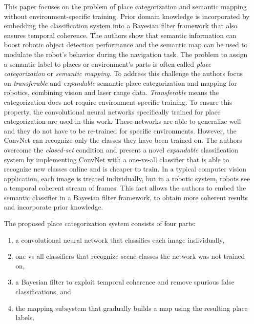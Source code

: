 This paper focuses on the problem of place categorization and semantic mapping without environment-specific training.  Prior domain knowledge is incorporated by embedding the classification system into a Bayesian
filter framework that also ensures temporal coherence. The authors show that semantic information can boost robotic object detection performance and the semantic map can be used to modulate the robot's behavior during the navigation task.
The problem to assign a semantic label to places or environment's parts is often called \textit{place categorization} or \textit{semantic mapping}. To address this challenge the authors  focus on \textit{transferable} and \textit{expandable} semantic place categorization and mapping for robotics, combining vision and laser range data. \textit{Transferable} means the categorization does not require environment-specific training. To ensure this property, the convolutional neural networks specifically trained for place categorization are used in this work. These networks are able to generalize well and they do not have to be re-trained for specific environments. However, the ConvNet can recognize only the classes they have been trained on. The authors overcome the \textit{closed-set} condition and present a novel \textit{expandable} classification system by implementing ConvNet with a one-vs-all classifier that is able to recognize new classes online and is cheaper to train. In a typical computer vision application, each image is treated individually, but in a robotic system, robots see a temporal coherent stream of frames. This fact allows the authors to embed the semantic classifier in a Bayesian filter framework, to obtain more coherent results and  incorporate prior knowledge.

\newpage

The proposed place categorization system consists of four parts:
\begin{enumerate}
\item a convolutional neural network that classifies each image individually,
\item one-vs-all classifiers that recognize scene classes the
network was not trained on,
\item a Bayesian filter to exploit temporal coherence and
remove spurious false classifications, and
\item the mapping subsystem that gradually builds a map
using the resulting place labels.
\end{enumerate}

